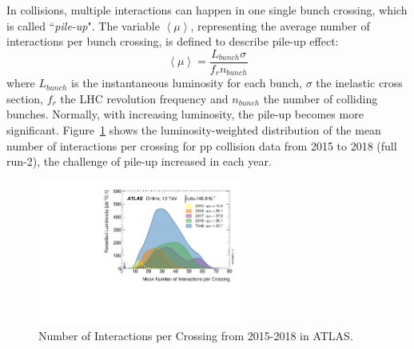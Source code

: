 In collisions, multiple interactions can happen in one single bunch crossing, which is called ``\textit{pile-up}".
The variable $\left< \mu \right>$, representing the average number of interactions per bunch crossing, 
is defined to describe pile-up effect:
\begin{equation}
	\left< \mu \right> = \frac{L_{bunch}\sigma}{f_{r}n_{bunch}}
\end{equation}
where $L_{bunch}$ is the instantaneous luminosity for each bunch, $\sigma$ the inelastic cross section,
$f_{r}$ the LHC revolution frequency and $n_{bunch}$ the number of colliding bunches.
Normally, with increasing luminosity, the pile-up becomes more significant.
Figure~\ref{fig:run2_mu} shows the luminosity-weighted distribution of the mean number of interactions per crossing
for pp collision data from 2015 to 2018 (full run-2), the challenge of pile-up increased in each year.
\begin{figure}[!htb]
  \centering
  \includegraphics[width=0.6\textwidth]{figures/Detector/mu_2015_2018.pdf}
  \caption{Number of Interactions per Crossing from 2015-2018 in ATLAS.}
  \label{fig:run2_mu}
\end{figure}
